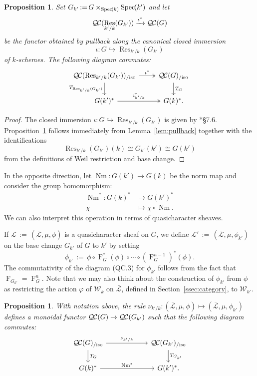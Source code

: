 \documentclass[CM,Submssn,SecEq]{degruyter-crelle} %
\theoremstyle{plain}
\newtheorem{proposition}[theorem]{Proposition}
\theoremstyle{definition}
\theoremstyle{remark}
\newcommand{\Weil}[1]{\mathcal{W}_{#1}}
\newcommand{\Frob}[1]{\operatorname{F}_{#1}}
\DeclareMathOperator{\Res}{Res}
\DeclareMathOperator{\Nm}{Nm}
\newcommand{\Spec}[1]{{\operatorname{Spec}\hskip-1pt( #1 )}}
\newcommand{\ceq}{{\, :=\, }}
\newcommand{\TrFrob}[1]{T_{#1}}
\newcommand{\qcs}[1]{{\mathcal{#1}}}
\newcommand{\gqcs}[1]{{\mathcal{\bar #1}}}
\newcommand{\QC}{{\mathcal{Q\hskip-0.8pt C}}}
\newcommand{\QCiso}[1]{\QC(#1)_{/\text{iso}}}
\begin{document}
\begin{proposition} \label{prop:csbe}
Set $G_{k'} \ceq G\times_\Spec{k} \Spec{k'}$ and let
\[
\QC(\Res_{k'/k}(G_{k'})) \xrightarrow{\iota^*} \QC(G)
\]
be the functor obtained by pullback along the canonical closed immersion 
\[\iota : G \hookrightarrow \Res_{k'/k}(G_{k'})\] of $k$-schemes.
The following diagram commutes:
\[
\begin{tikzcd}
\QCiso{\Res_{k'/k}(G_{k'})} \arrow[two heads]{r}{\iota^*} \dar[swap]{\TrFrob{\Res_{k'/k}(G_{k'})}} & \QCiso{G} \dar{\TrFrob{G}} \\
G(k')^* \arrow[two heads]{r}{i_{k'/k}^*} & G(k)^*.
\end{tikzcd}
\]
\end{proposition}
\begin{proof}
The closed immersion $\iota : G \hookrightarrow \Res_{k'/k}(G_{k'})$ is given by \cite{bosch-lutkebohmert-reynaud:NeronModels}*{\S 7.6}.
Proposition~\ref{prop:csbe} follows immediately from Lemma~\ref{lem:pullback} together with the identifications
\[
\Res_{k'/k}(G_{k'})(k) \cong G_{k'}(k') \cong G(k')
\]
from the definitions of Weil restriction and base change.
\end{proof}

In the opposite direction, let $\Nm : G(k') \to G(k)$ be the norm map and consider the group homomorphism:
\begin{align*}
\Nm^* : G(k)^* &\to G(k')^* \\
\chi &\mapsto \chi\circ \Nm.
\end{align*}
We can also interpret this operation in terms of quasicharacter sheaves.

If $\qcs{L} \ceq (\gqcs{L}, \mu, \phi)$ is a quasicharacter sheaf on $G$, we define
$\qcs{L}' \ceq (\gqcs{L}, \mu, \phi_{k'})$ on the base change
$G_{k'}$ of $G$ to $k'$ by setting
\[
\phi_{k'} \ceq \phi \circ \Frob{G}^*(\phi) \circ \cdots \circ (\Frob{G}^{n-1})^*(\phi).
\]
The commutativity of the diagram (QC.3) for $\phi_{k'}$
follows from the fact that $\Frob{G_{k'}} = \Frob{G}^n$.
Note that we may also think about the construction of $\phi_{k'}$ from $\phi$
as restricting the action $\varphi$ of $\Weil{k}$ on $\gqcs{L}$,
defined in Section~\ref{ssec:category}, to $\Weil{k'}$.

\begin{proposition}\label{prop:basechange}
With notation above,
the rule $\nu_{k'/k}: (\gqcs{L}, \mu, \phi) \mapsto (\gqcs{L}, \mu, \phi_{k'})$
 defines a monoidal functor $\QC(G) \to \QC(G_{k'})$
 such that the following diagram commutes:
\[
\begin{tikzcd}[column sep=60]
\QCiso{G} \rar{\nu_{k'/k}} \dar{\TrFrob{G}} & \QCiso{G_{k'}} \dar{\TrFrob{G_{k'}}} \\
G(k)^*  \rar{\Nm^*} & G(k')^*.
\end{tikzcd}
\]
\end{proposition}
\end{document}

